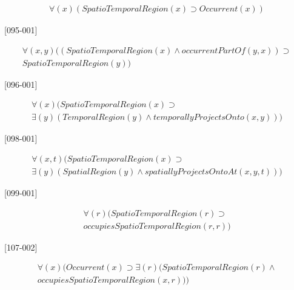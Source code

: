 \documentclass{article}
\begin{document}
\begin{flushright}
[094-005] 

\begin{equation}
\begin{split}
{\forall}(x)(SpatioTemporalRegion(x) \supset Occurrent(x))
\end{split}
\end{equation}

[095-001] 

\begin{equation}
\begin{split}
{\forall}(x, y)((SpatioTemporalRegion(x) \wedge occurrentPartOf(y, x)) \supset \\
SpatioTemporalRegion(y))
\end{split}
\end{equation}

[096-001] 

\begin{equation}
\begin{split}
{\forall}(x)(SpatioTemporalRegion(x) \supset \\
{\exists}(y)(TemporalRegion(y) \wedge temporallyProjectsOnto(x, y)))
\end{split}
\end{equation}

[098-001] 

\begin{equation}
\begin{split}
{\forall}(x, t)(SpatioTemporalRegion(x) \supset \\
{\exists}(y)(SpatialRegion(y) \wedge spatiallyProjectsOntoAt(x, y, t)))
\end{split}
\end{equation}

[099-001] 

\begin{equation}
\begin{split}
{\forall}(r)(SpatioTemporalRegion(r) \supset \\
occupiesSpatioTemporalRegion(r, r))
\end{split}
\end{equation}

[107-002] 

\begin{equation}
\begin{split}
{\forall}(x)(Occurrent(x) \supset {\exists}(r)(SpatioTemporalRegion(r) \wedge \\
occupiesSpatioTemporalRegion(x, r)))
\end{split}
\end{equation}


\end{flushright}
\end{document}
